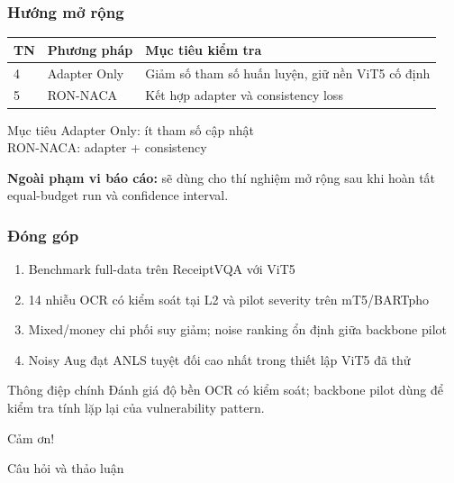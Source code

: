 \documentclass{beamer}
\begin{document}
\begin{frame}
\frametitle{Hướng mở rộng}

\begin{table}
\small
\centering
\begin{tabular}{lll}
\toprule
\textbf{TN} & \textbf{Phương pháp} & \textbf{Mục tiêu kiểm tra} \\
\midrule
4 & Adapter Only & Giảm số tham số huấn luyện, giữ nền ViT5 cố định \\
5 & RON-NACA & Kết hợp adapter và consistency loss \\
\bottomrule
\end{tabular}
\end{table}

\vspace{0.2cm}

\begin{block}{Mục tiêu}
Adapter Only: ít tham số cập nhật\\
RON-NACA: adapter + consistency
\end{block}

\textbf{Ngoài phạm vi báo cáo:} sẽ dùng cho thí nghiệm mở rộng sau khi hoàn tất equal-budget run và confidence interval.

\end{frame}

\begin{frame}
\frametitle{Đóng góp}

\begin{enumerate}
    \item Benchmark full-data trên ReceiptVQA với ViT5
    \item 14 nhiễu OCR có kiểm soát tại L2 và pilot severity trên mT5/BARTpho
    \item Mixed/money chi phối suy giảm; noise ranking ổn định giữa backbone pilot
    \item Noisy Aug đạt ANLS tuyệt đối cao nhất trong thiết lập ViT5 đã thử
\end{enumerate}

\begin{block}{Thông điệp chính}
Đánh giá độ bền OCR có kiểm soát; backbone pilot dùng để kiểm tra tính lặp lại của vulnerability pattern.
\end{block}

\end{frame}

\begin{frame}
\begin{center}
\Huge{Cảm ơn!}

\vspace{1cm}

\Large{Câu hỏi và thảo luận}
\end{center}
\end{frame}
\end{document}
